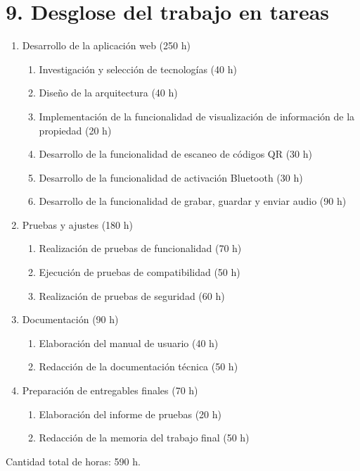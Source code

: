 \documentclass[
11pt, %
codirector, %
]{charter}
\begin{document}
\section{9. Desglose del trabajo en tareas}
\label{sec:wbs}
\begin{enumerate}
\item Desarrollo de la aplicación web (250 h)
\begin{enumerate}
    \item Investigación y selección de tecnologías (40 h)
    \item Diseño de la arquitectura (40 h)
    \item Implementación de la funcionalidad de visualización de información de la propiedad (20 h)
    \item Desarrollo de la funcionalidad de escaneo de códigos QR (30 h)
    \item Desarrollo de la funcionalidad de activación Bluetooth (30 h)
    \item Desarrollo de la funcionalidad de grabar, guardar y enviar audio (90 h)
\end{enumerate}
\item Pruebas y ajustes (180 h)
\begin{enumerate}
    \item Realización de pruebas de funcionalidad (70 h)
    \item Ejecución de pruebas de compatibilidad (50 h)
    \item Realización de pruebas de seguridad (60 h)
\end{enumerate}

\item Documentación (90 h)
\begin{enumerate}
    \item Elaboración del manual de usuario (40 h)
    \item Redacción de la documentación técnica (50 h)
\end{enumerate}

\item Preparación de entregables finales (70 h)
\begin{enumerate}
    \item Elaboración del informe de pruebas (20 h)
    \item Redacción de la memoria del trabajo final (50 h)
\end{enumerate}
\end{enumerate}

Cantidad total de horas: 590 h.
\end{document}
